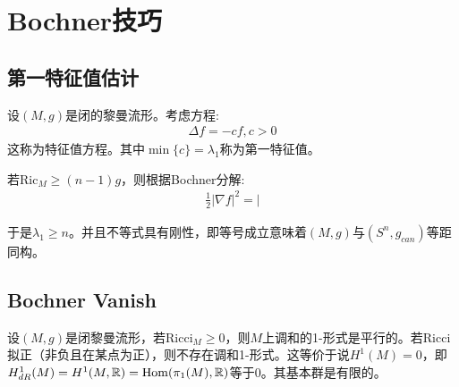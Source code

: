 \section{Bochner技巧}
\subsection{第一特征值估计}
设$(M,g)$是闭的黎曼流形。考虑方程:
\begin{align*}
    \Delta f=-cf,c>0
\end{align*}
这称为特征值方程。其中$\min\{c\}=\lambda_1$称为第一特征值。

若$\mathrm{Ric}_M \geq (n-1)g$，则根据Bochner分解:
\begin{align*}
    \frac{1}{2}|\nabla f|^2=|
\end{align*}

于是$\lambda_1 \geq n$。并且不等式具有刚性，即等号成立意味着$(M,g)$与$(S^n,g_{can})$等距同构。

\subsection{Bochner Vanish}
\begin{theorem}[Bochner,1948]
    设$(M,g)$是闭黎曼流形，若$\mathrm{Ricci}_M \geq 0$，则$M$上调和的1-形式是平行的。若$\mathrm{Ricci}$拟正（非负且在某点为正），则不存在调和1-形式。这等价于说$H^1(M)=0$，即$H^1_{dR}(M)=H^1(M,\mathbb{R})=\mathrm{Hom}(\pi_1(M),\mathbb{R})$等于$0$。其基本群是有限的。
\end{theorem}
\ifx\allfiles\undefined
	
	
	
	
	\else
	\fi